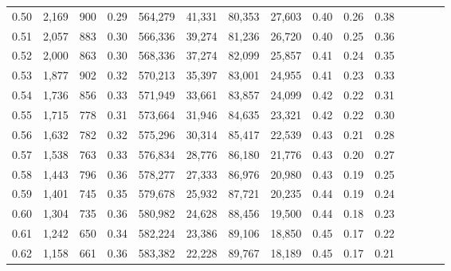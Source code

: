 \begin{tabular}{rrrcrrrrrrrrrrr}
0.50 &   2,169 &    900 &                                       0.29 &  564,279 &   41,331 &   80,353 &   27,603 &  0.40 &  0.26 &                         0.38 \\
0.51 &   2,057 &    883 &                                       0.30 &  566,336 &   39,274 &   81,236 &   26,720 &  0.40 &  0.25 &                         0.36 \\
0.52 &   2,000 &    863 &                                       0.30 &  568,336 &   37,274 &   82,099 &   25,857 &  0.41 &  0.24 &                         0.35 \\
0.53 &   1,877 &    902 &                                       0.32 &  570,213 &   35,397 &   83,001 &   24,955 &  0.41 &  0.23 &                         0.33 \\
0.54 &   1,736 &    856 &                                       0.33 &  571,949 &   33,661 &   83,857 &   24,099 &  0.42 &  0.22 &                         0.31 \\
0.55 &   1,715 &    778 &                                       0.31 &  573,664 &   31,946 &   84,635 &   23,321 &  0.42 &  0.22 &                         0.30 \\
0.56 &   1,632 &    782 &                                       0.32 &  575,296 &   30,314 &   85,417 &   22,539 &  0.43 &  0.21 &                         0.28 \\
0.57 &   1,538 &    763 &                                       0.33 &  576,834 &   28,776 &   86,180 &   21,776 &  0.43 &  0.20 &                         0.27 \\
0.58 &   1,443 &    796 &                                       0.36 &  578,277 &   27,333 &   86,976 &   20,980 &  0.43 &  0.19 &                         0.25 \\
0.59 &   1,401 &    745 &                                       0.35 &  579,678 &   25,932 &   87,721 &   20,235 &  0.44 &  0.19 &                         0.24 \\
0.60 &   1,304 &    735 &                                       0.36 &  580,982 &   24,628 &   88,456 &   19,500 &  0.44 &  0.18 &                         0.23 \\
0.61 &   1,242 &    650 &                                       0.34 &  582,224 &   23,386 &   89,106 &   18,850 &  0.45 &  0.17 &                         0.22 \\
0.62 &   1,158 &    661 &                                       0.36 &  583,382 &   22,228 &   89,767 &   18,189 &  0.45 &  0.17 &                         0.21 \\

\end{tabular}
